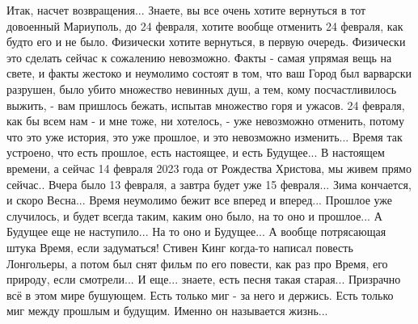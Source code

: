 Итак, насчет возвращения... Знаете, вы все очень хотите вернуться в тот
довоенный Мариуполь, до 24 февраля, хотите вообще отменить 24 февраля, как
будто его и не было. Физически хотите вернуться, в первую очередь. Физически
это сделать сейчас к сожалению невозможно.  Факты - самая упрямая вещь на
свете, и факты жестоко и неумолимо состоят в том, что ваш Город был варварски
разрушен, было убито множество невинных душ, а тем, кому посчастливилось
выжить, - вам пришлось бежать, испытав множество горя и ужасов. 24 февраля, как
бы всем нам - и мне тоже, ни хотелось, - уже невозможно отменить, потому что
это уже история, это уже прошлое, и это невозможно изменить... Время так
устроено, что есть прошлое, есть настоящее, и есть Будущее...  В настоящем
времени, а сейчас 14 февраля 2023 года от Рождества Христова, мы живем прямо
сейчас.. Вчера было 13 февраля, а завтра будет уже 15 февраля...  Зима
кончается, и скоро Весна... Время неумолимо бежит все вперед и вперед...
Прошлое уже случилось, и будет всегда таким, каким оно было, на то оно и
прошлое... А Будущее еще не наступило... На то оно и Будущее... А вообще
потрясающая штука Время, если задуматься! Стивен Кинг когда-то написал повесть
Лонгольеры, а потом был снят фильм по его повести, как раз про Время, его
природу, если смотрели... И еще... знаете, есть песня такая старая...
Призрачно всё в этом мире бушующем. Есть только миг - за него и держись.  Есть
только миг между прошлым и будущим.  Именно он называется жизнь...

